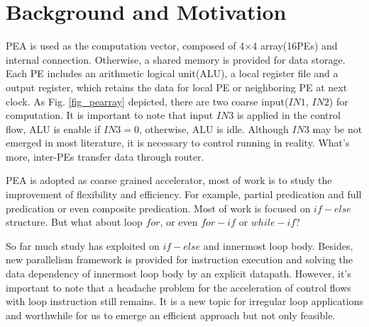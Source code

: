 \documentclass[10pt, conference, compsocconf]{IEEEtran}
\begin{document}
\section{Background and Motivation}
PEA is used as the computation vector, composed of 4$\times$4 array(16PEs) and internal connection. Otherwise, a shared memory is provided for data storage. Each PE includes an arithmetic logical unit(ALU), a local register file and a output register, which retains the data for local PE or neighboring PE at next clock. As Fig. \ref{fig_pearray} depicted, there are two coarse input($IN1$, $IN2$) for computation. It is important to note that input $IN3$ is applied in the control flow, ALU is enable if $IN3 = 0$, otherwise, ALU is idle. Although $IN3$ may be not emerged in most literature, it is necessary to control running in reality. What's more, inter-PEs transfer data through router.


PEA is adopted as coarse grained accelerator, most of work is to study the improvement of flexibility and efficiency. For example, partial predication and full predication\cite{mo-parashar2014efficient} or even composite predication\cite{mo-wang2015acceleration}. Most of work is focused on $if-else$ structure. But what about loop $for$, or even $for-if$ or $while-if$?

So far much study has exploited on $if-else$  and innermost loop body\cite{in-kim2012improving}. Besides, new parallelism framework is provided for instruction execution and solving the data dependency of innermost loop body by an explicit datapath. However, it's important to note that a headache problem for the acceleration of control flows with loop instruction still remains. It is a new topic for irregular loop applications and worthwhile for us to emerge an efficient approach but not only feasible.
\end{document}
